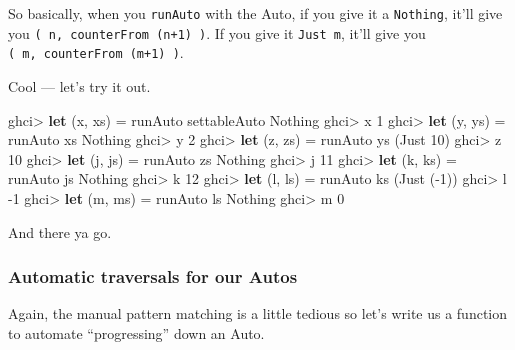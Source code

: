 \documentclass[]{article}
\newenvironment{Shaded}{}{}
\newcommand{\DataTypeTok}[1]{\textcolor[rgb]{0.56,0.13,0.00}{#1}}
\newcommand{\DecValTok}[1]{\textcolor[rgb]{0.25,0.63,0.44}{#1}}
\newcommand{\KeywordTok}[1]{\textcolor[rgb]{0.00,0.44,0.13}{\textbf{#1}}}
\newcommand{\NormalTok}[1]{#1}
\newcommand{\OperatorTok}[1]{\textcolor[rgb]{0.40,0.40,0.40}{#1}}
\newcommand{\OtherTok}[1]{\textcolor[rgb]{0.00,0.44,0.13}{#1}}
\begin{document}
So basically, when you \texttt{runAuto} with the Auto, if you give it a
\texttt{Nothing}, it'll give you \texttt{(\ n,\ counterFrom\ (n+1)\ )}. If you
give it \texttt{Just\ m}, it'll give you \texttt{(\ m,\ counterFrom\ (m+1)\ )}.

Cool --- let's try it out.

\begin{Shaded}
\begin{Highlighting}[]
\NormalTok{ghci}\OperatorTok{\textgreater{}} \KeywordTok{let}\NormalTok{ (x, xs) }\OtherTok{=}\NormalTok{ runAuto settableAuto }\DataTypeTok{Nothing}
\NormalTok{ghci}\OperatorTok{\textgreater{}}\NormalTok{ x}
\DecValTok{1}
\NormalTok{ghci}\OperatorTok{\textgreater{}} \KeywordTok{let}\NormalTok{ (y, ys) }\OtherTok{=}\NormalTok{ runAuto xs }\DataTypeTok{Nothing}
\NormalTok{ghci}\OperatorTok{\textgreater{}}\NormalTok{ y}
\DecValTok{2}
\NormalTok{ghci}\OperatorTok{\textgreater{}} \KeywordTok{let}\NormalTok{ (z, zs) }\OtherTok{=}\NormalTok{ runAuto ys (}\DataTypeTok{Just} \DecValTok{10}\NormalTok{)}
\NormalTok{ghci}\OperatorTok{\textgreater{}}\NormalTok{ z}
\DecValTok{10}
\NormalTok{ghci}\OperatorTok{\textgreater{}} \KeywordTok{let}\NormalTok{ (j, js) }\OtherTok{=}\NormalTok{ runAuto zs }\DataTypeTok{Nothing}
\NormalTok{ghci}\OperatorTok{\textgreater{}}\NormalTok{ j}
\DecValTok{11}
\NormalTok{ghci}\OperatorTok{\textgreater{}} \KeywordTok{let}\NormalTok{ (k, ks) }\OtherTok{=}\NormalTok{ runAuto js }\DataTypeTok{Nothing}
\NormalTok{ghci}\OperatorTok{\textgreater{}}\NormalTok{ k}
\DecValTok{12}
\NormalTok{ghci}\OperatorTok{\textgreater{}} \KeywordTok{let}\NormalTok{ (l, ls) }\OtherTok{=}\NormalTok{ runAuto ks (}\DataTypeTok{Just}\NormalTok{ (}\OperatorTok{{-}}\DecValTok{1}\NormalTok{))}
\NormalTok{ghci}\OperatorTok{\textgreater{}}\NormalTok{ l}
\OperatorTok{{-}}\DecValTok{1}
\NormalTok{ghci}\OperatorTok{\textgreater{}} \KeywordTok{let}\NormalTok{ (m, ms) }\OtherTok{=}\NormalTok{ runAuto ls }\DataTypeTok{Nothing}
\NormalTok{ghci}\OperatorTok{\textgreater{}}\NormalTok{ m}
\DecValTok{0}
\end{Highlighting}
\end{Shaded}

And there ya go.

\subsubsection{Automatic traversals for our
Autos}\label{automatic-traversals-for-our-autos}

Again, the manual pattern matching is a little tedious so let's write us a
function to automate ``progressing'' down an Auto.
\end{document}
